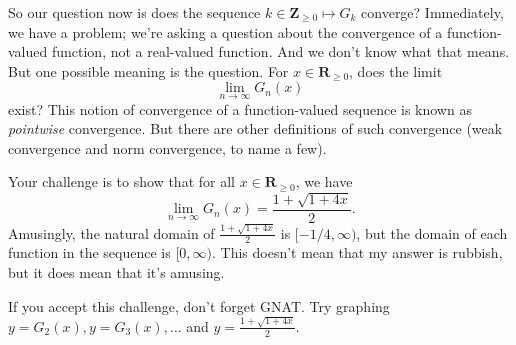 \documentclass[12pt,fleqn,answers]{exam}
\newcommand{\reals}{\mathbf{R}}
\newcommand{\integers}{\mathbf{Z}}
\begin{document}
\begin{questions}
So our question now is does the sequence $k \in \integers_{\geq 0} \mapsto G_k$ converge?  Immediately, we have a problem; we're asking a 
question about the convergence of a function-valued function, not a real-valued function.  And we don't know what that means.  But one 
possible meaning is the question. For $x \in \reals_{\geq 0}$, does the limit
\begin{equation*}
      \lim_{n \to \infty} G_n(x) 
\end{equation*}
exist?  This notion of convergence of a function-valued sequence is known as \emph{pointwise} convergence.  But there are other definitions
of such convergence (weak convergence and norm convergence, to name a few).

\quad Your challenge is to show that for all $x \in \reals_{\geq 0}$, we have 
\begin{equation*}
      \lim_{n \to \infty} G_n(x)  = \frac{1 + \sqrt{1 + 4 x}}{2}.
\end{equation*}
Amusingly, the natural domain of $\frac{1 + \sqrt{1 + 4 x}}{2}$ is $[-1/4, \infty)$, but the domain of each function in the sequence is $[0,\infty)$.
This doesn't mean that my answer is rubbish, but it does mean that it's amusing. 

\quad If you accept this challenge, don't forget GNAT.  Try graphing $y = G_2(x), y = G_3(x), \dots$ and $y = \frac{1 + \sqrt{1 + 4 x}}{2}$.


  


\end{questions}
\end{document}
